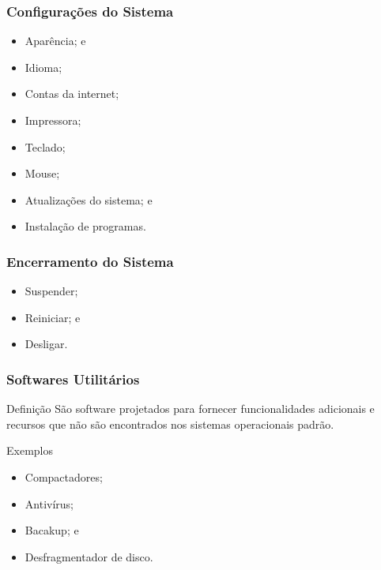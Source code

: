 \documentclass[aspectratio=169]{beamer} %
\begin{document}
\begin{frame}
	\frametitle{Configura\c cões do Sistema}
	
	\begin{itemize}
		\item Aparência; e
		\item Idioma;
		\item Contas da internet;
		\item Impressora;
		\item Teclado;
		\item Mouse;
		\item Atualiza\c cões do sistema; e
		\item Instala\c cão de programas.
	\end{itemize}
\end{frame}

\begin{frame}
	\frametitle{Encerramento do Sistema}
	
	\begin{itemize}
		\item Suspender;
		\item Reiniciar; e
		\item Desligar.
	\end{itemize}
\end{frame}

\begin{frame}
	\frametitle{Softwares Utilitários}
	
	\begin{block}{Defini\c cão}
		São software projetados para fornecer funcionalidades adicionais e recursos que não são encontrados nos sistemas operacionais padrão.
	\end{block}\vfill
	
	\begin{exampleblock}{Exemplos}
		\begin{itemize}
			\item Compactadores;
			\item Antivírus;
			\item Bacakup; e
			\item Desfragmentador de disco.
		\end{itemize}
	\end{exampleblock}
\end{frame}
\end{document}
